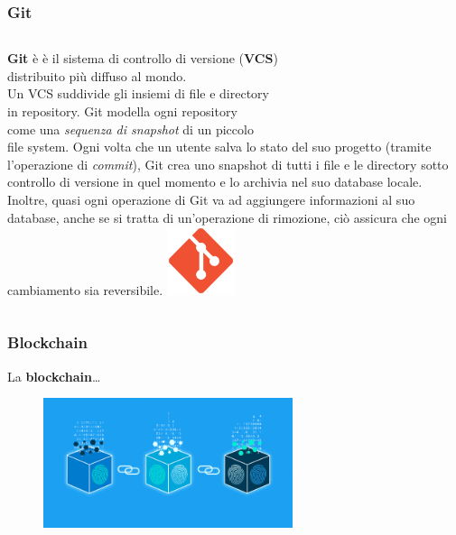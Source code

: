 \documentclass{beamer}
\begin{document}
\begin{frame}
	\frametitle{Git}

	\begin{columns}[T]
		\textbf{Git} è  è il sistema di controllo di versione (\textbf{VCS}) \\
		distribuito più diffuso al mondo. \\
		Un VCS suddivide gli insiemi di file e directory\\ in repository.
		Git modella ogni repository\\come una \emph{sequenza di snapshot} 
		di un piccolo\\ file system.
		Ogni volta che un utente salva lo stato del suo progetto
		(tramite l'operazione di \emph{commit}), Git crea uno snapshot
		di tutti i file e le directory sotto controllo di versione in
		quel momento e lo archivia nel suo database locale.
		Inoltre, quasi ogni operazione di Git va ad aggiungere informazioni
		al suo database, anche se si tratta
		di un'operazione di rimozione, ciò assicura che ogni cambiamento
		sia reversibile.
		\hspace*{-2cm}
		\includegraphics[width=2cm]{figures/git.png}
	\end{columns}

\end{frame}

\begin{frame}
	\frametitle{Blockchain}
	La \textbf{blockchain}\dots
	\medskip
	\begin{figure}
		\includegraphics[width=0.65\textwidth]{figures/blockchain.png}
	\end{figure}
\end{frame}
\end{document}
